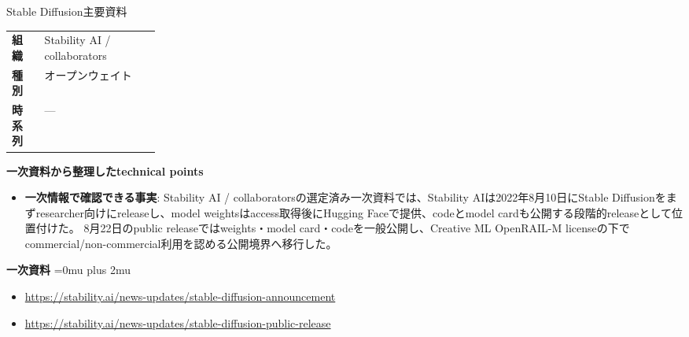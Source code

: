 \begin{technicalnote}{Stable Diffusion}{主要資料}
\begingroup
\begin{tabularx}{\linewidth}{@{}>{\bfseries}p{0.22\linewidth}X@{}}
組織 & Stability AI / collaborators \\
種別 & オープンウェイト \\
時系列 & — \\
\end{tabularx}
\smallskip
{\bfseries 一次資料から整理したtechnical points}
\begin{itemize}[leftmargin=1.5em,itemsep=0.35em]
\item \textbf{一次情報で確認できる事実}: Stability AI / collaboratorsの選定済み一次資料では、Stability AIは2022年8月10日にStable Diffusionをまずresearcher向けにreleaseし、model weightsはaccess取得後にHugging Faceで提供、codeとmodel cardも公開する段階的releaseとして位置付けた。 8月22日のpublic releaseではweights・model card・codeを一般公開し、Creative ML OpenRAIL-M licenseの下でcommercial/non-commercial利用を認める公開境界へ移行した。
\end{itemize}
\begin{minipage}{\linewidth}
\begin{samepage}
{\bfseries 一次資料}
\begingroup\sloppy
\Urlmuskip=0mu plus 2mu\relax
\begin{itemize}[leftmargin=1.5em,itemsep=0.25em]
\item {\scriptsize\url{https://stability.ai/news-updates/stable-diffusion-announcement}}
\item {\scriptsize\url{https://stability.ai/news-updates/stable-diffusion-public-release}}
\end{itemize}
\endgroup
\end{samepage}
\end{minipage}
\endgroup
\end{technicalnote}
\medskip

